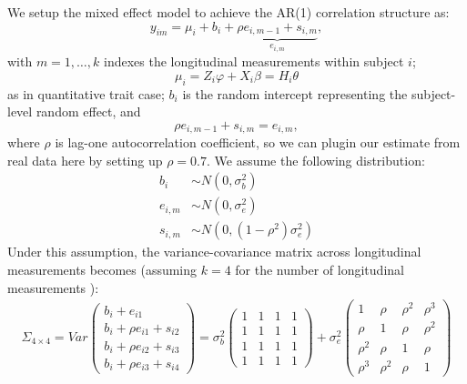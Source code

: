 \documentclass[compress]{beamer}
\begin{document}
We setup the mixed effect model to achieve the AR(1) correlation structure as:\\
\begin{equation}
y_{im} = \mu_{i} + b_i + \underbrace{ \rho e_{i,m-1} + s_{i,m} }_{ e_{i,m} }  ,
\label{eq:y_im_split}
\end{equation}
with $m = 1,\ldots,k$ indexes the longitudinal measurements within subject $i$; $$\mu_{i} = Z_i \varphi + X_i \beta = H_i \theta$$ as in quantitative trait case; $b_i$ is the random intercept representing the subject-level random effect, and
$$
\rho e_{i,m-1} + s_{i,m} = e_{i,m},
$$ 
where $\rho$ is lag-one autocorrelation coefficient, so we can plugin our estimate from real data here by setting up $\rho = 0.7$. We assume the following distribution:\\
\begin{align*}
b_i & \sim N(0,\sigma_b^2)\\
e_{i,m} & \sim  N(0, \sigma_e^2)\\
s_{i,m} & \sim  N(0, (1 - \rho^2) \sigma_e^2 )
\end{align*}
Under this assumption, the variance-covariance matrix across longitudinal measurements becomes (assuming $k = 4$ for the number of longitudinal measurements ):
\begin{eqnarray}
\Sigma_{4\times 4} = Var 
\begin{pmatrix}
b_i + e_{i1}\\
b_i + \rho e_{i1} + s_{i2}\\
b_i + \rho e_{i2} + s_{i3}\\
b_i + \rho e_{i3} + s_{i4}
\end{pmatrix}
= \sigma_b^2
\begin{pmatrix}
1 & 1 & 1 & 1\\
1 & 1 & 1 & 1\\
1 & 1 & 1 & 1\\
1 & 1 & 1 & 1
\end{pmatrix}
+ \sigma_e^2 
\begin{pmatrix}
1 & \rho & \rho^2 & \rho^3 \\
\rho & 1 & \rho & \rho^2 \\
\rho^2 & \rho & 1 & \rho \\
\rho^3 & \rho^2 & \rho & 1
\end{pmatrix}
\label{eq:v-cov_split}
\end{eqnarray}
\end{document}
